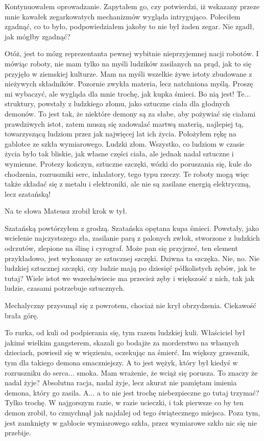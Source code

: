 Kontynuowałem oprowadzanie.
Zapytałem go, czy potwierdzi, iż wskazany przeze mnie kawałek zegarkowatych mechanizmów wygląda intrygująco.
Poleciłem zgadnąć, co to było, podpowiedziałem jakoby to nie był żaden zegar.
Nie zgadł, jak mógłby zgadnąć?
\begin{dialogue}
\ds{} Otóż, jest to mózg reprezentanta pewnej wybitnie nieprzyjemnej nacji robotów.
I mówiąc roboty, nie mam tylko na myśli ludzików zasilanych na prąd, jak to się przyjęło w ziemskiej kulturze.
Mam na myśli wszelkie żywe istoty zbudowane z nieżywych składników. Pozornie zwykła materia, lecz natchniona myślą.
\ds{} Proszę mi wybaczyć, ale wygląda dla mnie trochę, jak kupka śmieci.
\ds{} Bo nią jest!
Te... struktury, powstały z ludzkiego złomu, jako sztuczne ciała dla głodnych demonów.
To jest tak, że niektóre demony są za słabe, aby pożywiać się ciałami prawdziwych istot, zatem muszą się zadowalać martwą materią, najlepiej tą, towarzyszącą ludziom przez jak najwięcej lat ich życia.
\dm{} Położyłem rękę na gablotce ze szkła wymiarowego. \dm{}
Ludzki złom. Wszystko, co ludziom w czasie życia było tak bliskie, jak własne części ciała, ale jednak nadal sztuczne i wymienne. 
Protezy kończyn, sztuczne szczęki, wózki do poruszania się, kule do chodzenia, rozruszniki serc, inhalatory, tego typu rzeczy.
Te roboty mogą więc także składać się z metalu i elektroniki, ale nie są zasilane energią elektryczną, lecz szatańską!
\end{dialogue}
Na te słowa Mateusz zrobił krok w tył.
\begin{dialogue}
\ds{} Szatańską \dm{} powtórzyłem z grodzą. \dm{} Szatańska opętana kupa śmieci.
Powstały, jako wcielenie najczystszego zła, zasilanie parą z palonych zwłok, stworzone z ludzkich odrzutów, zlepione na ślinę i cyrograf.
Może pan się przyjrzeć, ten element przykładowo, jest wykonany ze sztucznej szczęki.
\ds{} Dziwna ta szczęka.
\ds{} Nie, no. Nie ludzkiej sztucznej szczęki, czy ludzie mają po dziesięć półkolistych zębów, jak te tutaj?
Wiele istot we wszechświecie ma przecież zęby i większość z nich, tak jak ludzie, czasami potrzebuje sztucznych.
\end{dialogue}
Mechalyczny przysunął się z powrotem, chociaż nie krył obrzydzenia. Ciekawość brała górę.
\begin{dialogue}
\ds{} To rurka, od kuli od podpierania się, tym razem ludzkiej kuli. 
Właściciel był jakimś wielkim gangsterem, skazali go bodajże za morderstwo na własnych dzieciach, powiesił się w więzieniu, oczekując na śmierć.
Im większy grzesznik, tym dla takiego demona smaczniejszy.
A to jest wężyk, który był kiedyś w rozruszniku do serca... smoka.
\ds{} Mam wrażenie, że wciąż się porusza. To znaczy że nadal żyje?
\ds{} Absolutna racja, nadal żyje, lecz akurat nie pamiętam imienia demona, który go zasila.
\ds{} A... a to nie jest trochę niebezpieczne go tutaj trzymać?
\ds{} Tylko trochę. W najgorszym razie, w razie ucieczki, i tak pierwsze co by ten demon zrobił, to czmychnął jak najdalej od tego świątecznego miejsca. 
Poza tym, jest zamknięty w gablocie wymiarowego szkła, przez wymiarowe szkło nic się nie przebije.
\end{dialogue}

